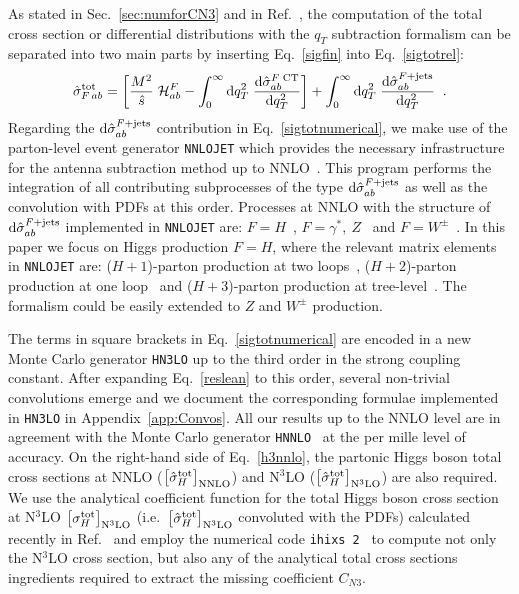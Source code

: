 \documentclass[12pt]{article}
\def\beeq{\begin{eqnarray}}
\def\eeeq{\end{eqnarray}}
\newcommand\f[2]{\frac{#1}{#2}}
\DeclareRobustCommand{\qt}{q_T}
\DeclareRobustCommand{\rd}{\ensuremath{\mathrm{d}}}
\begin{document}
As stated in Sec.~\ref{sec:numforCN3} and in Ref.~\cite{Catani:2007vq}, the computation of the total cross section or differential distributions with the  $\qt$ subtraction formalism can be separated into two main parts by inserting Eq.~\eqref{sigfin} into Eq.~\eqref{sigtotrel}:
\beeq
\label{sigtotnumerical} 
{\hat \sigma}_{F \,ab}^{{\rm {tot}}}
 = \left[\f{M^2}{\hat s} \;{\cal H}_{ab}^F - \int_0^{\infty} \rd\qt^2 \;
   \f{\rd{\hat \sigma}_{ab}^{F\;{\rm CT}}}{\rd \qt^2}\right]
+ \int_0^{\infty} \rd\qt^2 \;\f{\rd{\hat \sigma}_{ab}^{F+{\rm jets}}}{\rd \qt^2} \;\;.
\eeeq
Regarding the $\rd{\hat \sigma}_{ab}^{F+{\rm jets}}$ contribution in Eq.~\eqref{sigtotnumerical}, we make use of the parton-level event generator \texttt{NNLOJET} which provides the necessary infrastructure for the antenna subtraction method up to NNLO~\cite{Antenna:method}. This program performs the integration of all contributing subprocesses of the type  $\rd{\hat \sigma}_{ab}^{F+{\rm jets}}$ as well as the convolution with PDFs at this order. Processes at NNLO with the structure of $\rd{\hat \sigma}_{ab}^{F+{\rm jets}}$ implemented in \texttt{NNLOJET} are: $F=H$~\cite{Chen:2016zka}, $F=\gamma^*,~Z$~\cite{Ridder:2015dxa,Gehrmann-DeRidder:2016jns} and $F=W^{\pm}$~\cite{Gehrmann-DeRidder:2017mvr}. In this paper we focus on Higgs production $F=H$, where the relevant matrix elements in 
 \texttt{NNLOJET} are: ($H+1$)-parton production at two loops~\cite{Gehrmann:2011aa}, ($H+2$)-parton production at one loop~\cite{Dixon:2009uk,Badger:2009hw,Badger:2009vh} and ($H+3$)-parton 
 production at tree-level~\cite{DelDuca:2004wt,Dixon:2004za,Badger:2004ty}. The formalism could be easily extended  to $Z$ and $W^{\pm}$ production. 

The terms in square brackets in Eq.~\eqref{sigtotnumerical}  are encoded in a new Monte Carlo generator \texttt{HN3LO} up to the third order in the strong coupling constant. After expanding Eq.~\eqref{reslean} to this order, several non-trivial convolutions emerge and we document the corresponding formulae implemented in \texttt{HN3LO} in Appendix~\ref{app:Convos}. All our results up to the NNLO level are in agreement with the Monte Carlo generator \texttt{HNNLO}~\cite{Catani:2007vq} at the per mille level of accuracy. On the right-hand side of Eq.~\eqref{h3nnlo}, the partonic Higgs boson total cross sections at NNLO ($\bigl[ {\hat \sigma}_{H}^{{\rm {tot}}} \bigr]_{\rm NNLO}$) and N$^{3}$LO  ($\bigl[ {\hat \sigma}_{H}^{{\rm {tot}}} \bigr]_{\rm N^{3}LO}$) are also required. We use the analytical coefficient function for the 
total Higgs boson cross section at N$^{3}$LO $\bigl[  \sigma_{H}^{{\rm {tot}}} \bigr]_{\rm N^{3}LO}$ (i.e.\ $\bigl[ {\hat \sigma}_{H}^{{\rm {tot}}} \bigr]_{\rm N^{3}LO}$ convoluted with the PDFs)  calculated recently in Ref.~\cite{Mistlberger:2018etf} and  employ the numerical code \texttt{ihixs 2}~\cite{Dulat:2018rbf} to compute not only the N$^{3}$LO cross section, but also
 any of the analytical total cross sections ingredients required to extract the missing coefficient $C_{N3}$.
\end{document}

